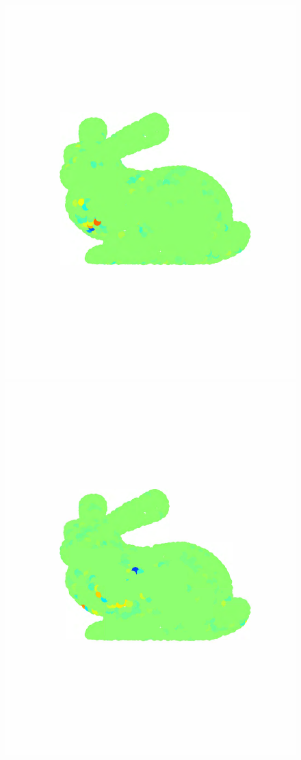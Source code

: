 \documentclass{article}
\begin{document}
\begin{figure}[bth]
\begin{minipage}[m]{0.16\linewidth}
\end{minipage}
\begin{minipage}[m]{0.16\linewidth}
\centerline{\includegraphics[width=.8\linewidth]{fig_bunny_coef_wav2}}
\end{minipage}
\begin{minipage}[m]{0.16\linewidth}
\centerline{\includegraphics[width=.8\linewidth]{fig_bunny_coef_wav3}}

\end{minipage}
\end{figure}
\end{document}

